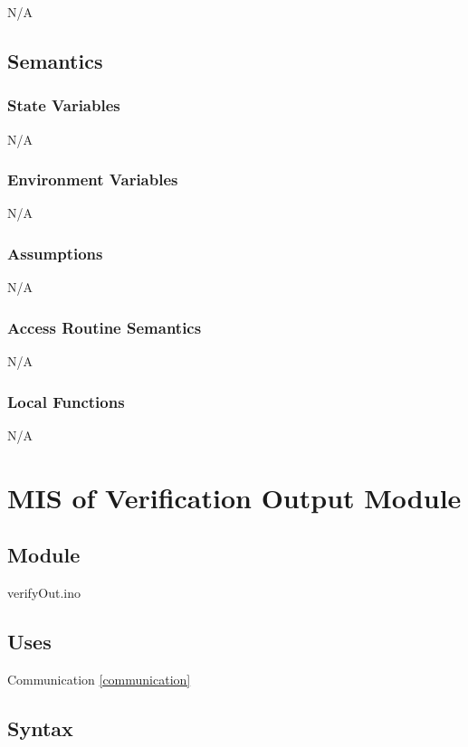 \documentclass[12pt, titlepage]{article}
\begin{document}
N/A

\subsection{Semantics}

\subsubsection{State Variables}

N/A

\subsubsection{Environment Variables}

N/A

\subsubsection{Assumptions}

N/A

\subsubsection{Access Routine Semantics}

N/A

\subsubsection{Local Functions}

N/A
  \section{MIS of Verification Output Module} \label{verificationOutput} 

\subsection{Module}

verifyOut.ino

\subsection{Uses}
Communication \ref{communication}

\subsection{Syntax}
\end{document}
